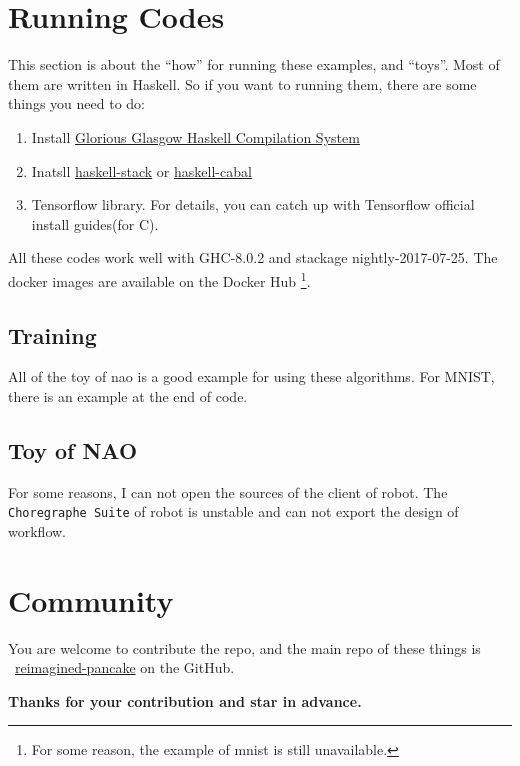 \documentclass{article}
\begin{document}
\begin{appendix}
	\section{Running Codes}
	\label{apdx:run}
	
	This section is about the ``how'' for running these examples, and ``toys''.
	Most of them are written in Haskell. So if you want to running them, there are some things
	you need to do:
	\begin{enumerate}
		\item Install \href{https://www.haskell.org/ghc}{Glorious Glasgow Haskell Compilation System}
		\item Inatsll \href{https://www.haskellstack.org}{haskell-stack} or \href{https://www.haskell.org/cabal/}{haskell-cabal}
		\item Tensorflow library. For details, you can catch up with Tensorflow official install guides(for C).
	\end{enumerate}

	All these codes work well with GHC-8.0.2 and stackage nightly-2017-07-25.
	The docker images are available on the Docker Hub%
	\footnote{For some reason, the example of mnist is still unavailable.}.
	
	\subsection{Training}
	\label{run:tc}
	
	All of the toy of nao is a good example for using these algorithms.
	For MNIST, there is an example at the end of code.
	
	\subsection{Toy of NAO}
	\label{run:toy}
	
	For some reasons, I can not open the sources of the client of robot. The \verb|Choregraphe Suite| of robot is unstable and can not export the design of workflow.
	
	
	
	\section{Community}
	\label{aptx:commuity}
	
	You are welcome to contribute the repo, and the main repo of these things is
	\ \href{https://github.com/Qinka/reimagined-pancake}{reimagined-pancake} on the GitHub.
	
	\vspace*{1em}
	\begin{center}
	{\large \textbf{Thanks for your contribution and star in advance.}}
	\end{center}
	
	
	\printbibliography
	\tableofcontents
\end{appendix}
\end{document}
